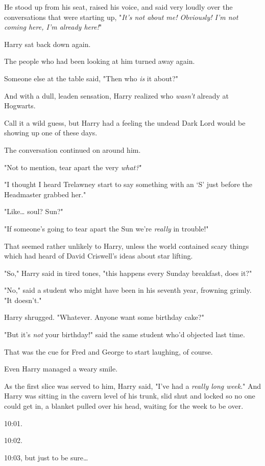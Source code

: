 He stood up from his seat, raised his voice, and said very loudly over the 
conversations that were starting up, "\emph{It's not about me! Obviously! I'm 
not coming here, I'm already here!}"

Harry sat back down again.

The people who had been looking at him turned away again.

Someone else at the table said, "Then who \emph{is} it about?"

And with a dull, leaden sensation, Harry realized who \emph{wasn't} already at 
Hogwarts.

Call it a wild guess, but Harry had a feeling the undead Dark Lord would be 
showing up one of these days.

The conversation continued on around him.

"Not to mention, tear apart the very \emph{what?}"

"I thought I heard Trelawney start to say something with an `S' just before the 
Headmaster grabbed her."

"Like{\ldots} soul? Sun?"

"If someone's going to tear apart the Sun we're \emph{really} in trouble!"

That seemed rather unlikely to Harry, unless the world contained scary things 
which had heard of David Criswell's ideas about star lifting.

"So," Harry said in tired tones, "this happens every Sunday breakfast, does it?"

"No," said a student who might have been in his seventh year, frowning grimly. 
"It doesn't."

Harry shrugged. "Whatever. Anyone want some birthday cake?"

"But it's \emph{not} your birthday!" said the same student who'd objected last 
time.

That was the cue for Fred and George to start laughing, of course.

Even Harry managed a weary smile.

As the first slice was served to him, Harry said, "I've had a \emph{really long 
week}."
\sbreak
And Harry was sitting in the cavern level of his trunk, slid shut and locked so 
no one could get in, a blanket pulled over his head, waiting for the week to be 
over.

10:01.

10:02.

10:03, but just to be sure{\ldots}

